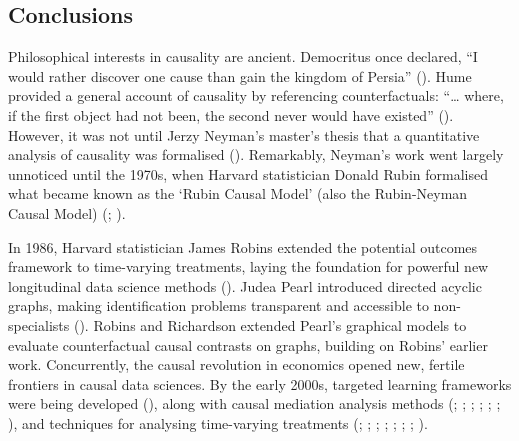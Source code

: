 \documentclass[
  single column]{article}
\begin{document}
\subsection{Conclusions}\label{id-sec-5}

Philosophical interests in causality are ancient. Democritus once
declared, ``I would rather discover one cause than gain the kingdom of
Persia'' (). Hume
provided a general account of causality by referencing counterfactuals:
``\ldots{} where, if the first object had not been, the second never
would have existed'' (). However, it
was not until Jerzy Neyman's master's thesis that a quantitative
analysis of causality was formalised
().
Remarkably, Neyman's work went largely unnoticed until the 1970s, when
Harvard statistician Donald Rubin formalised what became known as the
`Rubin Causal Model' (also the Rubin-Neyman Causal Model)
(;
).

In 1986, Harvard statistician James Robins extended the potential
outcomes framework to time-varying treatments, laying the foundation for
powerful new longitudinal data science methods
(). Judea Pearl introduced
directed acyclic graphs, making identification problems transparent and
accessible to non-specialists ().
Robins and Richardson extended Pearl's graphical models to evaluate
counterfactual causal contrasts on graphs, building on Robins' earlier
work. Concurrently, the causal revolution in economics opened new,
fertile frontiers in causal data sciences. By the early 2000s, targeted
learning frameworks were being developed
(), along with
causal mediation analysis methods (; ;
;
;
;
;
), and
techniques for analysing time-varying treatments
(;
;
;
;
;
;
;
).
\end{document}
